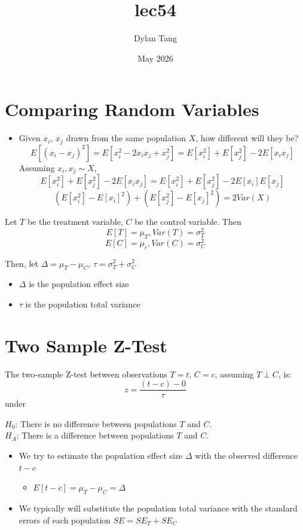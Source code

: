 \documentclass{article}
\title{lec54}
\author{Dylan Tang}
\date{May 2026}
\begin{document}
\maketitle

\section{Comparing Random Variables}
\begin{itemize}
    \item Given $x_i$, $x_j$ drawn from the same population $X$, how different will they be?
    \[
        E[(x_i - x_j)^2] = E[x_i^2 - 2x_ix_j + x_j^2] = E[x_i^2] + E[x_j^2] - 2E[x_ix_j]
    \]
    Assuming $x_i, x_j \sim X$,
    \[
     E[x_i^2] + E[x_j^2] - 2E[x_ix_j] = E[x_i^2] + E[x_j^2] - 2E[x_i]E[x_j]
    \]
    \[
        (E[x_i^2] - E[x_i]^2) + (E[x_j^2] - E[x_j]^2) = 2Var(X)
    \]
\end{itemize}

Let $T$ be the treatment variable, $C$ be the control variable.
Then
\[
    E[T] = \mu_T, Var(T) = \sigma_T^2
\]
\[
    E[C] = \mu_c, Var(C) = \sigma_C^2
\]

Then, let $\Delta = \mu_T - \mu_C$, $\tau = \sigma_T^2 + \sigma_C^2$

\begin{itemize}
    \item $\Delta$ is the population effect size
    \item $\tau$ is the population total variance
\end{itemize}

\section{Two Sample Z-Test}
The two-sample Z-test between observations $T = t$, $C = c$, assuming $T \perp C$, is:
\[
    z = \frac{(t - c) - 0}{\tau}
\]
under 

$H_0$: There is no difference between populations $T$ and $C$. \\

$H_A$: There is a difference between populations $T$ and $C$.
\begin{itemize}
    \item We try to estimate the population effect size $\Delta$ with the observed difference $t - c$
    \begin{itemize}
        \item $E[t - c] = \mu_T - \mu_C = \Delta$
    \end{itemize}
    \item We typically will substitute the population total variance with the standard errors of each population $SE = SE_T + SE_C$
\end{itemize}
\end{document}
